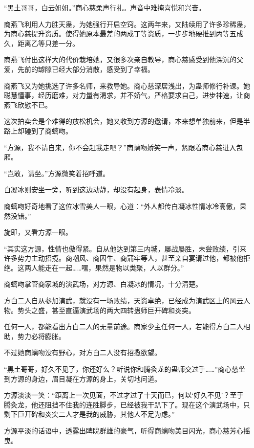 \begin{this_body}
“黑土哥哥，白云姐姐。”商心慈柔声行礼。声音中难掩喜悦和兴奋。

商燕飞利用人力胜天蛊，为她强行开启空窍。这两年来，又陆续用了许多珍稀蛊，为商心慈提升资质。使得她原本最差的两成丁等资质，一步步地硬推到丙等五成久，距离乙等只差一分。

商燕飞付出这样大的代价栽培她，又很多次亲自教导，商心慈感受到他深沉的父爱，先前的罅隙已经大部分消散，感受到了幸福。

商燕飞又为她挑选了许多名师，来教导她。商心慈深居浅出，为蛊师修行补课。她聪慧懂事，经历磨难，对力量有渴求，并不娇气，严格要求自己，进步神速，让商燕飞欣慰不已。

这次拍卖会是个难得的放松机会，她又收到方源的邀请，本来想单独前来，但是半路上却碰到了商螭吻。

“方源，我不请自来，你不会赶我走吧？”商螭吻娇笑一声，紧跟着商心慈进入包厢。

“岂敢，请坐。”方源微笑着招呼道。

白凝冰则安坐一旁，听到这边动静，却没有起身，表情冷淡。

商螭吻好奇地看了这位冰雪美人一眼，心道：“外人都传白凝冰性情冰冷高傲，果然没错。”

旋即，又看方源一眼。

“其实这方源，性情也傲得紧。自从他达到第三内城，屡战屡胜，未尝败绩，引来许多势力主动招揽。商嘲风、商囚牛、商蒲牢等人，甚至亲自宴请过他，都被他拒绝。这两人能走在一起……嘿，果然是物以类聚，人以群分。”

商螭吻掌管商家城的演武场，对方源、白凝冰的情况，十分清楚。

方白二人自从参加演武，就没有一场败绩，天资卓绝，已经成为演武区上的风云人物。势头之盛，甚至直逼演武场的两大四转蛊师巨开碑和炎突。

任何一人，都能看出方白二人的无量前途。商家少主任何一人，若能得方白二人相助，势力必将膨胀。

不过她商螭吻没有野心，对方白二人没有招揽欲望。

“黑土哥哥，好久不见了，你还好么？听说你和腾灸龙的蛊师交过手……”商心慈坐到方源的身边，眉目凝在方源的身上，关切地问道。

方源淡淡一笑：“距离上一次见面，不过才过了十天而已，何以‘好久不见’？至于腾灸龙，他还阻挡不住我的连胜脚步，已经被我干趴下了。现在这个演武场中，只剩下巨开碑和炎突二人才是我的威胁，其他人不足为虑。”

方源平淡的话语中，透露出睥睨群雄的豪气，听得商螭吻美目闪光，商心慈芳心摇曳。

\end{this_body}

